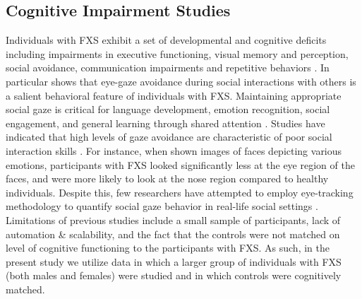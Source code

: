 \documentclass[10pt,twocolumn,letterpaper]{article}
\begin{document}
\subsection{Cognitive Impairment Studies} Individuals with FXS exhibit a set of developmental and cognitive deficits including impairments in executive functioning, visual memory and perception, social avoidance, communication impairments and repetitive behaviors \cite{Hall:2006jd,Pimentel:1999vx,Sullivan:2007gz,Sullivan:2006jc}. In particular \cite{Hall:2012ge} shows that eye-gaze avoidance during social interactions with others is a salient behavioral feature of individuals with FXS. Maintaining appropriate social gaze is critical for language development, emotion recognition, social engagement, and general learning through shared attention \cite{Csibra:2006wf, Morales:2000br,Emery:2000ug}. Studies have indicated that high levels of gaze avoidance are characteristic of poor social interaction skills \cite{DohertySneddon:2013fv,Riby:2012il}. For instance, when shown images of faces depicting various emotions, participants with FXS looked significantly less at the eye region of the faces, and were more likely to look at the nose region compared to healthy individuals. Despite this, few researchers have attempted to employ eye-tracking methodology to quantify social gaze behavior in real-life social settings \cite{Farzin:2009fq, Farzin:2011ip}.   Limitations of previous studies include a small sample of participants, lack of automation \& scalability, and the fact that the controls were not matched on level of cognitive functioning to the participants with FXS. As such, in the present study we utilize data in which a larger group of individuals with FXS (both males and females) were studied and in which controls were cognitively matched.
\end{document}
